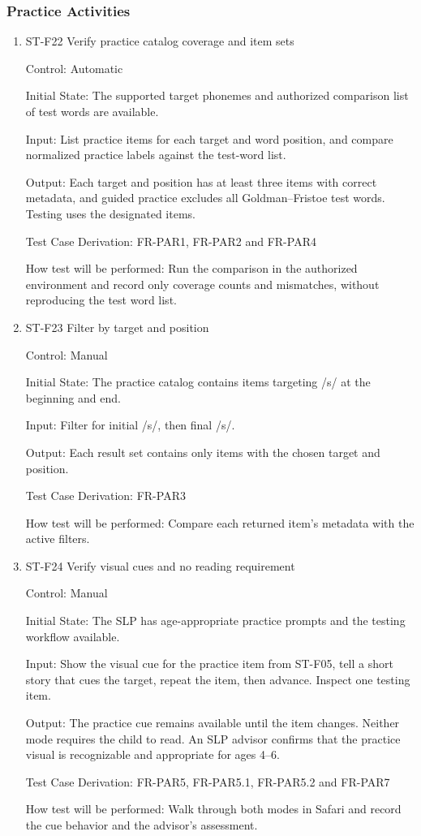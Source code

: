\documentclass[12pt, titlepage]{article}
\newcommand{\PracticeItemMinimum}{three}
\begin{document}
\subsubsection{Practice Activities}

\begin{enumerate}

\item{ST-F22 Verify practice catalog coverage and item sets\\}

Control: Automatic

Initial State: The supported target phonemes and authorized comparison list of test words are available.

Input: List practice items for each target and word position, and compare normalized practice labels against the test-word list.

Output: Each target and position has at least \PracticeItemMinimum{} items with correct metadata, and guided practice excludes all Goldman--Fristoe test words. Testing uses the designated items.

Test Case Derivation: FR-PAR1, FR-PAR2 and FR-PAR4

How test will be performed: Run the comparison in the authorized environment and record only coverage counts and mismatches, without reproducing the test word list.

\item{ST-F23 Filter by target and position\\}

Control: Manual

Initial State: The practice catalog contains items targeting /s/ at the beginning and end.

Input: Filter for initial /s/, then final /s/.

Output: Each result set contains only items with the chosen target and position.

Test Case Derivation: FR-PAR3

How test will be performed: Compare each returned item's metadata with the active filters.

\item{ST-F24 Verify visual cues and no reading requirement\\}

Control: Manual

Initial State: The SLP has age-appropriate practice prompts and the testing workflow available.

Input: Show the visual cue for the practice item from ST-F05, tell a short story that cues the target, repeat the item, then advance. Inspect one testing item.

Output: The practice cue remains available until the item changes. Neither mode requires the child to read. An SLP advisor confirms that the practice visual is recognizable and appropriate for ages 4--6.

Test Case Derivation: FR-PAR5, FR-PAR5.1, FR-PAR5.2 and FR-PAR7

How test will be performed: Walk through both modes in Safari and record the cue behavior and the advisor's assessment.

\end{enumerate}
\end{document}
